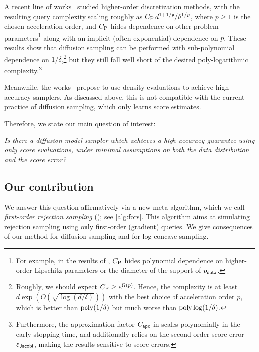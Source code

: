\documentclass{article} %
\begin{document}
A recent line of works~\citep[e.g.,][]{huang2025convergence, huang2025fast, li2025faster} studied higher-order discretization methods, with the resulting query complexity scaling roughly as $C_{\rm P}\, d^{1+1/p}/\delta^{1/p}$,
where $p\geq 1$ is the chosen acceleration order, and $C_{\rm P}$ hides dependence on other problem parameters\footnote{For example, in the results of \citet{huang2024reverse,huang2025convergence,huang2025fast}, $C_{\rm P}$ hides polynomial dependence on higher-order Lipschitz parameters or the diameter of the support of $p_{\mathsf{data}}$.} 
along with an implicit (often exponential) dependence on $p$. These results show that diffusion sampling can be performed with sub-polynomial dependence on $1/\delta$,\footnote{
  Roughly, we should expect $C_{\rm P}\geq e^{\Omega(p)}$. Hence, the complexity is at least $d\exp(O(\sqrt{\log(d/\delta)}))$ with the best choice of acceleration order $p$, which is better than $\mathrm{poly}(1/\delta)$ but much worse than $\mathrm{poly}\log(1/\delta)$.
}
but they still fall well short of the desired poly-logarithmic complexity.\footnote{Furthermore, the approximation factor $C_{\texttt{apx}}$ in \citet{huang2025convergence,huang2025fast} scales polynomially in the early stopping time, and \citet{li2025faster} additionally relies on the second-order score error $\varepsilon_{\mathsf{Jacobi}}$, making the results sensitive to score errors.}

Meanwhile, the works~\citet{huang2024reverse, wainwright2025score} propose to use density evaluations to achieve high-accuracy samplers.
As discussed above, this is not compatible with the current practice of diffusion sampling, which only learns score estimates.

Therefore, we state our main question of interest:
\begin{center}
    \emph{Is there a diffusion model sampler which achieves a high-accuracy guarantee using only score evaluations, under minimal assumptions on both the data distribution and the score error?}
\end{center}





\subsection{Our contribution}


We answer this question affirmatively via a new meta-algorithm, which we call \emph{first-order rejection sampling} (\AlgWSC); see \cref{alg:fors}.
This algorithm aims at simulating rejection sampling using only first-order (gradient) queries.
We give consequences of our method for diffusion sampling and for log-concave sampling.
\end{document}
